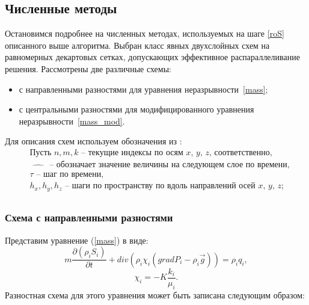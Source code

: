 \subsection{Численные методы}
Остановимся подробнее на численных методах, используемых на шаге \ref{roS}
описанного выше алгоритма. Выбран класс явных двухслойных схем
на равномерных декартовых сетках,
допускающих эффективное распараллеливание решения.
Рассмотрены две различные схемы:
\begin{itemize}
\item с направленными разностями для уравнения неразрывности~\ref{mass};
\item с центральными разностями для модифицированного уравнения неразрывности~\ref{mass_mod}.
\end{itemize}
Для описания схем используем обозначения из \cite{Kalitkin}:
\begin{equation*}
  \begin{aligned}
    &\text{Пусть } n, m, k \text{ -- текущие индексы по осям $x$, $y$, $z$, соответственно,}\\
    &\widehat{\qquad} \text{ -- обозначает значение величины на следующем слое по времени,}\\
    &\tau \text{ -- шаг по времени,}\\
    &h_x, h_y, h_z \text{ -- шаги по пространству по 
    вдоль направлений осей $x$, $y$, $z$};\\
  \end{aligned}
\end{equation*}


\subsubsection*{Схема с направленными разностями}
Представим уравнение (\ref{mass}) в виде:
 \begin{equation}
 	 m \frac{\partial (\rho_i S_i)}{\partial t}+ div(\rho_i \chi_i (grad P_i - {\rho}_i\overrightarrow{g})) = \rho_i q_i,
 \end{equation}
 $$\chi_i=-K\frac{k_i}{\mu_i}.$$
Разностная схема для этого уравнения может быть записана следующим
образом:

